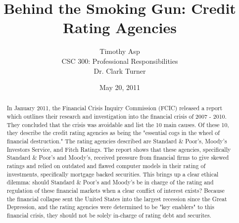 \documentclass[11pt]{article}
\begin{document}
\title{\vfill Behind the Smoking Gun: Credit Rating Agencies} %
\author{
Timothy Asp\vspace{10pt} \\
CSC 300: Professional Responsibilities\vspace{10pt} \\
Dr. Clark Turner\vspace{10pt} \\
}
\date{May 20, 2011}

\maketitle

\vfill  %
\begin{abstract}
In January 2011, the Financial Crisis Inquiry Commission (FCIC) released a report which outlines their research and investigation into the financial crisis of 2007 - 2010.  They concluded that the crisis was avoidable and list the 10 main causes.\cite[p.~417-418]{govtReport}  Of these 10, they describe the credit rating agencies as being the "essential cogs in the wheel of financial destruction."\cite[p.~xxv]{govtReport} The rating agencies described are Standard \& Poor's, Moody's Investors Service, and Fitch Ratings.  The report shows that these agencies, specifically Standard \& Poor's and Moody's, received pressure from financial firms to give skewed ratings \cite{ratingEthics, hRatingEthics} and relied on outdated and flawed computer models in their rating of investments, specifically mortgage backed securities. \cite[p.~xxv]{govtReport}  This brings up a clear ethical dilemma: should Standard \& Poor's and Moody's be in charge of the rating and regulation of these financial markets when a clear conflict of interest exists?  Because the financial collapse sent the United States into the largest recession since the Great Depression, and the rating agencies were determined to be "key enablers" to this financial crisis, they should not be solely in-charge of rating debt and securites. 
\end{abstract}

\thispagestyle{empty} %
\newpage


\thispagestyle{empty}  %
\tableofcontents
\end{document}
